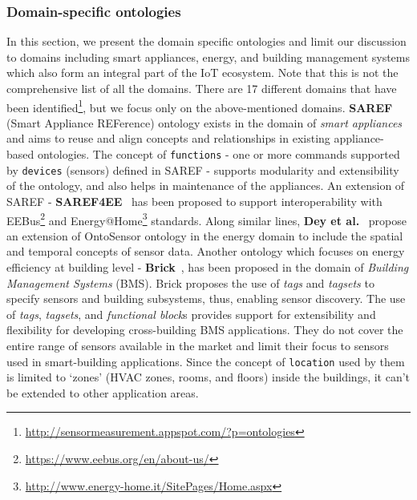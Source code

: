 \documentclass{elsart}  %
\begin{document}
\subsubsection{Domain-specific ontologies}
In this section, we present the domain specific ontologies and limit our discussion to domains including smart appliances, energy, and building management systems which also form an integral part of the IoT ecosystem. Note that this is not the comprehensive list of all the domains. There are 17 different domains that have been identified\footnote{\url{http://sensormeasurement.appspot.com/?p=ontologies}}, but we focus only on the above-mentioned domains.
\textbf{SAREF}~\cite{saref} (Smart Appliance REFerence) ontology exists in the domain of \textit{smart appliances} and aims to reuse and align concepts and relationships in existing appliance-based ontologies. The concept of \texttt{functions} - one or more commands supported by \texttt{devices} (sensors) defined in SAREF - supports modularity and extensibility of the ontology, and also helps in maintenance of the appliances. An extension of SAREF - \textbf{SAREF4EE}~\cite{daniele2016interoperability} has been proposed to support interoperability with EEBus\footnote{\url{https://www.eebus.org/en/about-us/}} and Energy@Home\footnote{\url{http://www.energy-home.it/SitePages/Home.aspx}} standards. Along similar lines, \textbf{Dey et al.}~\cite{dey2014sensor} propose an extension of OntoSensor ontology in the energy domain to include the spatial and temporal concepts of sensor data. Another ontology which focuses on energy efficiency at building level - \textbf{Brick}~\cite{balaji2016brick}, has been proposed in the domain of \textit{Building Management Systems} (BMS). Brick proposes the use of \textit{tags} and \textit{tagsets} to specify sensors and building subsystems, thus, enabling sensor discovery. The use of \textit{tags}, \textit{tagsets}, and \textit{functional block}s provides support for extensibility and flexibility for developing cross-building BMS applications. They do not cover the entire range of sensors available in the market and limit their focus to sensors used in smart-building applications. Since the concept of \texttt{location} used by them is limited to `zones' (HVAC zones, rooms, and floors) inside the buildings, it can't be extended to other application areas.  
\end{document}
